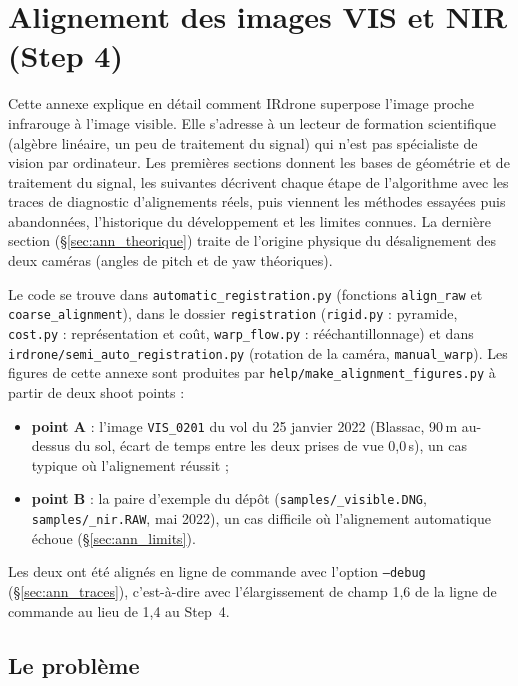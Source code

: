 \documentclass[a4paper,11pt]{report}
\begin{document}
\appendix
\chapter{Alignement des images VIS et NIR (Step 4)}\label{sec:ann_algorithme}
Cette annexe explique en détail comment IRdrone superpose l'image proche infrarouge à l'image visible. Elle s'adresse à un lecteur de formation scientifique (algèbre linéaire, un peu de traitement du signal) qui n'est pas spécialiste de vision par ordinateur. Les premières sections donnent les bases de géométrie et de traitement du signal, les suivantes décrivent chaque étape de l'algorithme avec les traces de diagnostic d'alignements réels, puis viennent les méthodes essayées puis abandonnées, l'historique du développement et les limites connues. La dernière section (§\ref{sec:ann_theorique}) traite de l'origine physique du désalignement des deux caméras (angles de \og pitch \fg{} et de \og yaw \fg{} théoriques).

Le code se trouve dans \texttt{automatic\_registration.py} (fonctions \texttt{align\_raw} et \texttt{coarse\_alignment}), dans le dossier \texttt{registration} (\texttt{rigid.py} : pyramide, \texttt{cost.py} : représentation et coût, \texttt{warp\_flow.py} : rééchantillonnage) et dans \texttt{irdrone/semi\_auto\_registration.py} (rotation de la caméra, \texttt{manual\_warp}). Les figures de cette annexe sont produites par \texttt{help/make\_alignment\_figures.py} à partir de deux shoot points :
\begin{itemize}
	\item \textbf{point A} : l'image \texttt{VIS\_0201} du vol du 25 janvier 2022 (Blassac, 90\,m au-dessus du sol, écart de temps entre les deux prises de vue 0,0\,s), un cas typique où l'alignement réussit ;
	\item \textbf{point B} : la paire d'exemple du dépôt (\texttt{samples/\_visible.DNG}, \texttt{samples/\_nir.RAW}, mai 2022), un cas difficile où l'alignement automatique échoue (§\ref{sec:ann_limits}).
\end{itemize}
Les deux ont été alignés en ligne de commande avec l'option \texttt{--debug} (§\ref{sec:ann_traces}), c'est-à-dire avec l'élargissement de champ 1,6 de la ligne de commande au lieu de 1,4 au Step~4.

\section{Le problème}\label{sec:ann_problem}
\end{document}
